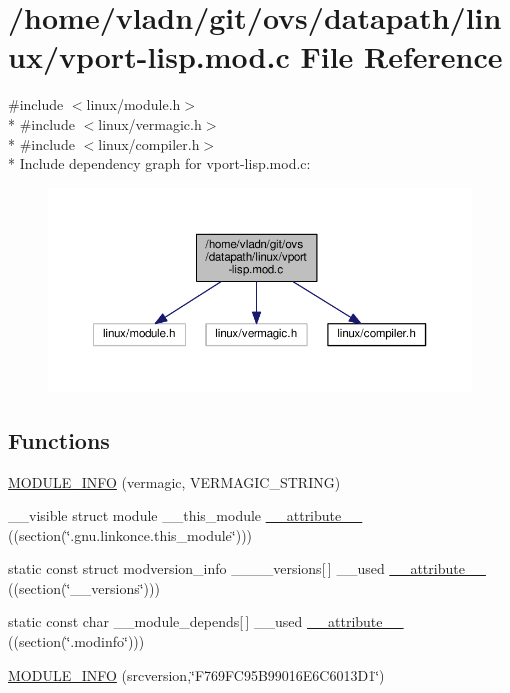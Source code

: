 \hypertarget{vport-lisp_8mod_8c}{}\section{/home/vladn/git/ovs/datapath/linux/vport-\/lisp.mod.\+c File Reference}
\label{vport-lisp_8mod_8c}
{\ttfamily \#include $<$linux/module.\+h$>$}\\*
{\ttfamily \#include $<$linux/vermagic.\+h$>$}\\*
{\ttfamily \#include $<$linux/compiler.\+h$>$}\\*
Include dependency graph for vport-\/lisp.mod.\+c\+:
\nopagebreak
\begin{figure}[H]
\begin{center}
\leavevmode
\includegraphics[width=350pt]{vport-lisp_8mod_8c__incl}
\end{center}
\end{figure}
\subsection*{Functions}
\begin{DoxyCompactItemize}
\item 
\hyperlink{vport-lisp_8mod_8c_a59ae061e50f755cbc9dbde3c6688273a}{M\+O\+D\+U\+L\+E\+\_\+\+I\+N\+F\+O} (vermagic, V\+E\+R\+M\+A\+G\+I\+C\+\_\+\+S\+T\+R\+I\+N\+G)
\item 
\+\_\+\+\_\+visible struct module \+\_\+\+\_\+this\+\_\+module \hyperlink{vport-lisp_8mod_8c_acc22bca8fb9ed0433181b5c98efdb5a4}{\+\_\+\+\_\+attribute\+\_\+\+\_\+} ((section(\char`\"{}.gnu.\+linkonce.\+this\+\_\+module\char`\"{})))
\item 
static const struct modversion\+\_\+info \+\_\+\+\_\+\+\_\+\+\_\+versions\mbox{[}$\,$\mbox{]} \+\_\+\+\_\+used \hyperlink{vport-lisp_8mod_8c_a3457b560a580904370cd8cbaddb0c902}{\+\_\+\+\_\+attribute\+\_\+\+\_\+} ((section(\char`\"{}\+\_\+\+\_\+versions\char`\"{})))
\item 
static const char \+\_\+\+\_\+module\+\_\+depends\mbox{[}$\,$\mbox{]} \+\_\+\+\_\+used \hyperlink{vport-lisp_8mod_8c_aebedc6dfadccd01faf3f462d4fa936f7}{\+\_\+\+\_\+attribute\+\_\+\+\_\+} ((section(\char`\"{}.modinfo\char`\"{})))
\item 
\hyperlink{vport-lisp_8mod_8c_a7ae20685150daec6154866cdbf149f71}{M\+O\+D\+U\+L\+E\+\_\+\+I\+N\+F\+O} (srcversion,\char`\"{}F769\+F\+C95\+B99016\+E6\+C6013\+D1\char`\"{})
\end{DoxyCompactItemize}


